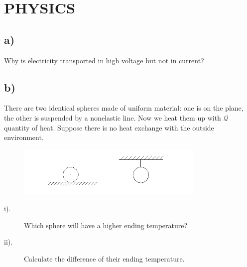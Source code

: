 \documentclass{article}
\begin{document}
\section{PHYSICS}
\subsection*{a)}
Why is electricity transported in high voltage but not in current?
\subsection*{b)}
There are two identical spheres made of uniform material: one is on the plane, the other is suspended by a nonelastic line. Now we heat them up with $\mathcal{Q}$ quantity of heat. Suppose there is no heat exchange with the outside environment. 
\begin{figure}[!ht]
\centering
\includegraphics[width=0.8\textwidth]{PolytechniquePhy.png}

\end{figure}
\begin{description}
  \item [i).]Which sphere will have a higher ending temperature?
  \item [ii).]Calculate the difference of their ending temperature.
\end{description}
\end{document}
